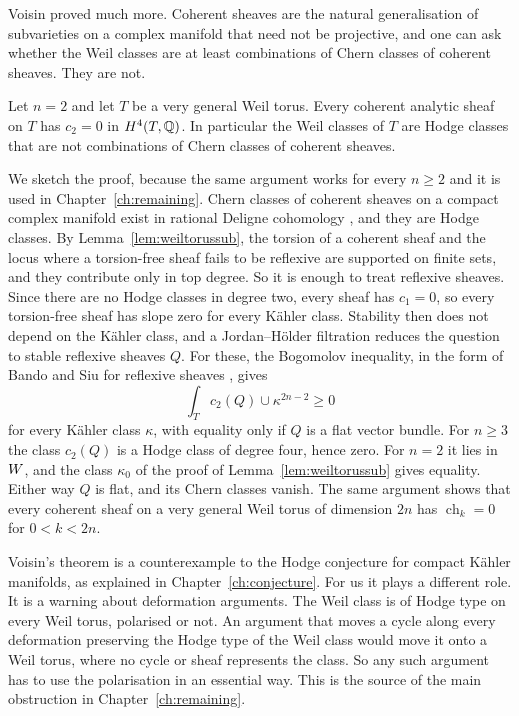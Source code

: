 Voisin proved much more. Coherent sheaves are the natural generalisation of
subvarieties on a complex manifold that need not be projective, and one can
ask whether the Weil classes are at least combinations of Chern classes of
coherent sheaves. They are not.

\begin{theorem}\label{thm:voisin}
Let $n=2$ and let $T$ be a very general Weil torus. Every coherent analytic
sheaf on $T$ has $c_{2}=0$ in $H^{4}(T,\mathbb{Q})$. In particular the Weil classes
of $T$ are Hodge classes that are not combinations of Chern classes of
coherent sheaves.
\end{theorem}

We sketch the proof, because the same argument works for every $n\ge2$ and
it is used in Chapter~\ref{ch:remaining}. Chern classes of coherent sheaves
on a compact complex manifold exist in rational Deligne cohomology
\cite{Gri10}, and they are Hodge classes. By Lemma~\ref{lem:weiltorussub}, the torsion of a
coherent sheaf and the locus where a torsion-free sheaf fails to be
reflexive are supported on finite sets, and they contribute only in top
degree. So it is enough to treat reflexive sheaves. Since there are no
Hodge classes in degree two, every sheaf has $c_{1}=0$, so every
torsion-free sheaf has slope zero for every K\"ahler class. Stability then
does not depend on the K\"ahler class, and a Jordan--H\"older filtration
reduces the question to stable reflexive sheaves $Q$. For these, the
Bogomolov inequality, in the form of Bando and Siu for reflexive sheaves
\cite{BS94}, gives
\[
  \int_{T}c_{2}(Q)\cup\kappa^{2n-2}\ge0
\]
for every K\"ahler class $\kappa$, with equality only if $Q$ is a flat
vector bundle. For $n\ge3$ the class $c_{2}(Q)$ is a Hodge class of degree
four, hence zero. For $n=2$ it lies in $W$, and the class $\kappa_{0}$ of
the proof of Lemma~\ref{lem:weiltorussub} gives equality. Either way $Q$ is
flat, and its Chern classes vanish. The same argument shows that every
coherent sheaf on a very general Weil torus of dimension $2n$ has
$\operatorname{ch}_{k}=0$ for $0<k<2n$.

Voisin's theorem is a counterexample to the Hodge conjecture for compact
K\"ahler manifolds, as explained in Chapter~\ref{ch:conjecture}. For us it
plays a different role. It is a warning about deformation arguments. The
Weil class is of Hodge type on every Weil torus, polarised or not. An
argument that moves a cycle along every deformation preserving the Hodge
type of the Weil class would move it onto a Weil torus, where no cycle or
sheaf represents the class. So any such argument has to use the
polarisation in an essential way. This is the source of the main obstruction
in Chapter~\ref{ch:remaining}.
